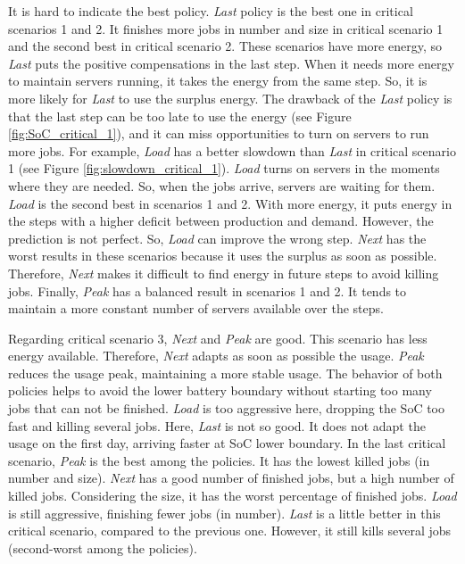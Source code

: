 It is hard to indicate the best policy. \emph{Last} policy is the best one in critical scenarios 1 and 2. It finishes more jobs in number and size in critical scenario 1 and the second best in critical scenario 2. These scenarios have more energy, so \emph{Last} puts the positive compensations in the last step. When it needs more energy to maintain servers running, it takes the energy from the same step. So, it is more likely for \emph{Last} to use the surplus energy. The drawback of the \emph{Last} policy is that the last step can be too late to use the energy (see Figure \ref{fig:SoC_critical_1}), and it can miss opportunities to turn on servers to run more jobs. For example, \emph{Load} has a better slowdown than \emph{Last} in critical scenario 1 (see Figure \ref{fig:slowdown_critical_1}). \emph{Load} turns on servers in the moments where they are needed. So, when the jobs arrive, servers are waiting for them. \emph{Load} is the second best in scenarios 1 and 2. With more energy, it puts energy in the steps with a higher deficit between production and demand. However, the prediction is not perfect. So, \emph{Load} can improve the wrong step. \emph{Next} has the worst results in these scenarios because it uses the surplus as soon as possible. Therefore, \emph{Next} makes it difficult to find energy in future steps to avoid killing jobs. Finally, \emph{Peak} has a balanced result in scenarios 1 and 2. It tends to maintain a more constant number of servers available over the steps. 

Regarding critical scenario 3, \emph{Next} and \emph{Peak} are good. This scenario has less energy available. Therefore, \emph{Next} adapts as soon as possible the usage. \emph{Peak} reduces the usage peak, maintaining a more stable usage. The behavior of both policies helps to avoid the lower battery boundary without starting too many jobs that can not be finished. \emph{Load} is too aggressive here, dropping the SoC too fast and killing several jobs. Here, \emph{Last} is not so good. It does not adapt the usage on the first day, arriving faster at SoC lower boundary. In the last critical scenario, \emph{Peak} is the best among the policies. It has the lowest killed jobs (in number and size). \emph{Next} has a good number of finished jobs, but a high number of killed jobs. Considering the size, it has the worst percentage of finished jobs. \emph{Load} is still aggressive, finishing fewer jobs (in number). \emph{Last} is a little better in this critical scenario, compared to the previous one. However, it still kills several jobs (second-worst among the policies). 

